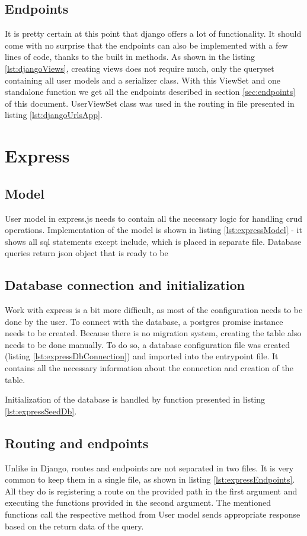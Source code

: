 \subsection{Endpoints}
It is pretty certain at this point that django offers a lot of functionality. It should come with no surprise that the endpoints can also be implemented with a few lines of code, thanks to the built in methods. As shown in the listing \ref{lst:djangoViews}, creating views does not require much, only the queryset containing all user models and a serializer class.  With this ViewSet and one standalone function we get all the endpoints described in section \ref{sec:endpoints} of this document. UserViewSet class was used in the routing in file presented in listing \ref{lst:djangoUrlsApp}.


%
%
\section{Express}
\subsection{Model}
User model in express.js needs to contain all the necessary logic for handling \acrshort{crud} operations. Implementation of the model is shown in listing \ref{lst:expressModel} - it shows all \acrshort{sql} statements except include, which is placed in separate file. Database queries return \acrshort{json} object that is ready to be


\subsection{Database connection and initialization}
Work with express is a bit more difficult, as most of the configuration needs to be done by the user. To connect with the database, a postgres promise instance needs to be created. Because there is no migration system, creating the table also needs to be done manually. To do so, a database configuration file was created (listing \ref{lst:expressDbConnection}) and imported into the entrypoint file. It contains all the necessary information about the connection and creation of the table.

Initialization of the database is handled by function presented in listing \ref{lst:expressSeedDb}.


\subsection{Routing and endpoints}
Unlike in Django, routes and endpoints are not separated in two files. It is very common to keep them in a single file, as shown in listing \ref{lst:expressEndpoints}. All they do is registering a route on the provided path in the first argument and executing the functions provided in the second argument. The mentioned functions call the respective method from User model sends appropriate response based on the return data of the query.


